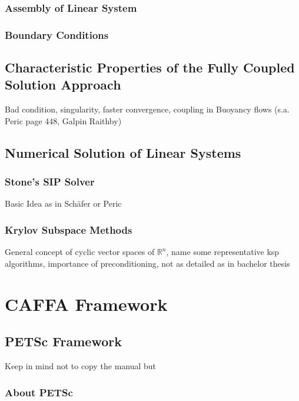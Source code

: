 \documentclass[article,type=msc,colorback,accentcolor=tud2a]{tudthesis}
\begin{document}
      \subsubsection{Assembly of Linear System}

      \subsubsection{Boundary Conditions}

    \subsection{Characteristic Properties of the Fully Coupled Solution Approach}

        Bad condition, singularity, faster convergence, coupling in Buoyancy flows (s.a. Peric page 448, Galpin Raithby)

    \subsection{Numerical Solution of Linear Systems}

        \subsubsection{Stone's SIP Solver}

          Basic Idea as in Schäfer or Peric

        \subsubsection{Krylov Subspace Methods}

          General concept of cyclic vector spaces of \(\mathbb{R}^n\), name some representative ksp algorithms, importance of preconditioning, not as detailed as in bachelor thesis

  \section{CAFFA Framework}

    \subsection{PETSc Framework}
        Keep in mind not to copy the manual but
      \subsubsection{About PETSc}
\end{document}
